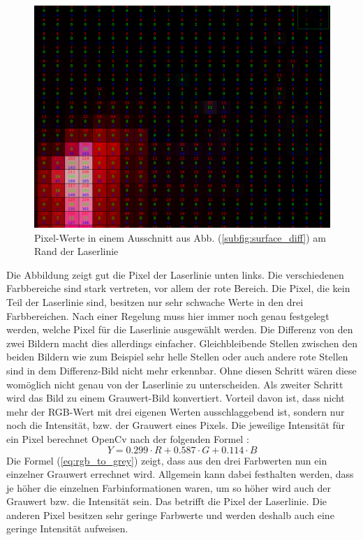 	\begin{figure}[h]
		\centering
		\includegraphics[width=0.75\linewidth]{img/hauptteil/bildverarbeitung/pixel_values.png}
		\caption[Pixel-Werte der Laserlinie]{Pixel-Werte in einem Ausschnitt aus Abb. (\ref{subfig:surface_diff}) am Rand der Laserlinie}
		\label{fig:pix_values}
	\end{figure} 
	
	Die Abbildung zeigt gut die Pixel der Laserlinie unten links. Die verschiedenen Farbbereiche sind stark vertreten, vor allem der rote Bereich. Die Pixel, die kein Teil der Laserlinie sind, besitzen nur sehr schwache Werte in den drei Farbbereichen. Nach einer Regelung muss hier immer noch genau festgelegt werden, welche Pixel für die Laserlinie ausgewählt werden. Die Differenz von den zwei Bildern macht dies allerdings einfacher. Gleichbleibende Stellen zwischen den beiden Bildern wie zum Beispiel sehr helle Stellen oder auch andere rote Stellen sind in dem Differenz-Bild nicht mehr erkennbar. Ohne diesen Schritt wären diese womöglich nicht genau von der Laserlinie zu unterscheiden. \newline
	Als zweiter Schritt wird das Bild zu einem Grauwert-Bild konvertiert. Vorteil davon ist, dass nicht mehr der RGB-Wert mit drei eigenen Werten ausschlaggebend ist, sondern nur noch die Intensität, bzw. der Grauwert eines Pixels. Die jeweilige Intensität für ein Pixel berechnet OpenCv nach der folgenden Formel \cite[Vgl.][]{noauthor_opencv_nodate}:
	\begin{equation}
	Y = 0.299 \cdot R + 0.587 \cdot G + 0.114 \cdot B
	\label{eq:rgb_to_grey}
	\end{equation}
	Die Formel (\ref{eq:rgb_to_grey}) zeigt, dass aus den drei Farbwerten nun ein einzelner Grauwert errechnet wird. Allgemein kann dabei festhalten werden, dass je höher die einzelnen Farbinformationen waren, um so höher wird auch der Grauwert bzw. die Intensität sein. Das betrifft die Pixel der Laserlinie. Die anderen Pixel besitzen sehr geringe Farbwerte und werden deshalb auch eine geringe Intensität aufweisen. 
	
